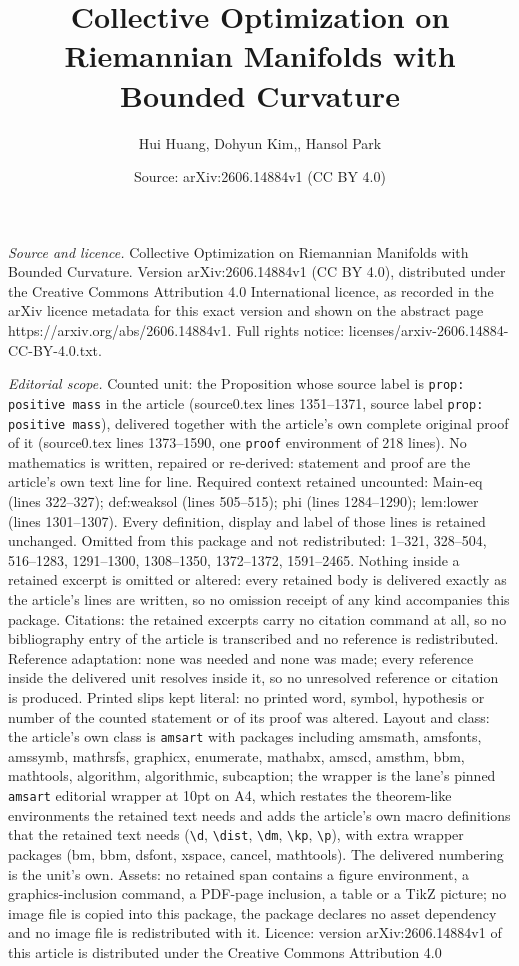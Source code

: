 \documentclass[10pt,a4paper]{amsart}
\title[Collective Optimization on Riemannian Manifolds with Bounded]{Collective Optimization on Riemannian Manifolds with Bounded Curvature}
\author{Hui Huang, Dohyun Kim,, Hansol Park}
\date{Source: arXiv:2606.14884v1 (CC BY 4.0)}
\begin{document}
\maketitle

\noindent\emph{Source and licence.} Collective Optimization on Riemannian Manifolds with Bounded Curvature. Version arXiv:2606.14884v1 (CC BY 4.0), distributed under the Creative Commons Attribution 4.0 International licence, as recorded in the arXiv licence metadata for this exact version and shown on the abstract page https://arxiv.org/abs/2606.14884v1. Full rights notice: licenses/arxiv-2606.14884-CC-BY-4.0.txt.\par\smallskip

\noindent\textit{Editorial scope.} Counted unit: the Proposition whose source label is \texttt{prop: positive mass} in the article (source0.tex lines 1351--1371, source label \texttt{prop: positive mass}), delivered together with the article's own complete original proof of it (source0.tex lines 1373--1590, one \texttt{proof} environment of 218 lines). No mathematics is written, repaired or re-derived: statement and proof are the article's own text line for line. Required context retained uncounted: Main-eq (lines 322--327); def:weaksol (lines 505--515); phi (lines 1284--1290); lem:lower (lines 1301--1307). Every definition, display and label of those lines is retained unchanged. Omitted from this package and not redistributed: 1--321, 328--504, 516--1283, 1291--1300, 1308--1350, 1372--1372, 1591--2465. Nothing inside a retained excerpt is omitted or altered: every retained body is delivered exactly as the article's lines are written, so no omission receipt of any kind accompanies this package. Citations: the retained excerpts carry no citation command at all, so no bibliography entry of the article is transcribed and no reference is redistributed. Reference adaptation: none was needed and none was made; every reference inside the delivered unit resolves inside it, so no unresolved reference or citation is produced. Printed slips kept literal: no printed word, symbol, hypothesis or number of the counted statement or of its proof was altered. Layout and class: the article's own class is \texttt{amsart} with packages including amsmath, amsfonts, amssymb, mathrsfs, graphicx, enumerate, mathabx, amscd, amsthm, bbm, mathtools, algorithm, algorithmic, subcaption; the wrapper is the lane's pinned \texttt{amsart} editorial wrapper at 10pt on A4, which restates the theorem-like environments the retained text needs and adds the article's own macro definitions that the retained text needs (\texttt{\textbackslash d}, \texttt{\textbackslash dist}, \texttt{\textbackslash dm}, \texttt{\textbackslash kp}, \texttt{\textbackslash p}), with extra wrapper packages (bm, bbm, dsfont, xspace, cancel, mathtools). The delivered numbering is the unit's own. Assets: no retained span contains a figure environment, a graphics-inclusion command, a PDF-page inclusion, a table or a TikZ picture; no image file is copied into this package, the package declares no asset dependency and no image file is redistributed with it. Licence: version arXiv:2606.14884v1 of this article is distributed under the Creative Commons Attribution 4.0 
\end{document}
